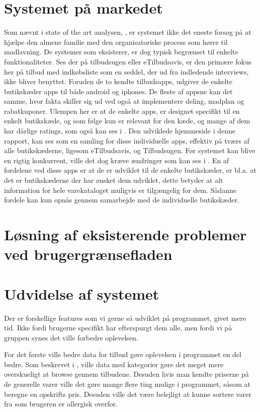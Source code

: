 \section{Systemet på markedet}
Som nævnt i state of the art analysen, , er systemet ikke det eneste forsøg på at hjælpe den almene familie med den organisatoriske process som hører til madlavning.
De systemer som eksisterer, er dog typisk begrænset til enkelte funktionaliteter.
Ses der på tilbudsugen eller eTilbudsavis, er den primære fokus her på tilbud med indkøbsliste som en seddel, der ud fra indledende interviews, ikke bliver benyttet.
Foruden de to kendte tilbudsapps, udgiver de enkelte butikskæder apps til både android og iphones.
De fleste af appsne kan det samme, hvor fakta skiller sig ud ved også at implementere deling, madplan og rabatkuponer.
Ulempen her er at de enkelte apps, er designet specifikt til en enkelt butikskæde, og som følge kun er relevant for den kæde, og mange af dem har dårlige ratings, som også kan ses i .
Den udviklede hjemmeside i denne rapport, kan ses som en samling for disse individuelle apps, effektiv på tværs af alle butikskæderne, ligesom eTilbudsavis, og Tilbudsugen.
Før systemet kan blive en rigtig konkurrent, ville det dog kræve ændringer som kan ses i .
En af fordelene ved disse apps er at de er udviklet til de enkelte butikskæder, er bl.a. at det er butikskæderne der har ønsket dem udviklet, dette betyder at alt information for hele varekataloget muligvis er tilgængelig for dem.
Sådanne fordele kan kun opnås gennem samarbejde med de individuelle butikskæder.

\section{Løsning af eksisterende problemer ved brugergrænsefladen}

\section{Udvidelse af systemet}\label{udvidelse}

Der er forskellige features som vi gerne så udviklet på programmet, givet mere tid. Ikke fordi brugerne specifikt har efterspurgt dem alle, men fordi vi på gruppen synes det ville forbedre oplevelsen.

For det første ville bedre data for tilbud gøre oplevelsen i programmet en del bedre.
Som beskrevet i , ville data med kategorier gøre det meget mere overskueligt at browse gennem tilbudene. 
Desuden hvis man kendte priserne på de generelle varer ville det gøre mange flere ting mulige i programmet, såsom at beregne en opskrifts pris. 
Desuden ville det være belejligt at kunne sortere varer fra som brugeren er allergisk overfor.

